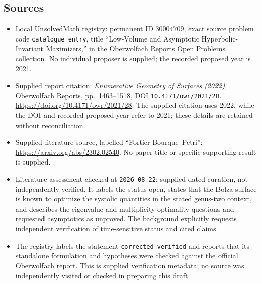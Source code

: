 \documentclass[11pt]{article}
\begin{document}
\subsection{Sources}
\begin{itemize}
\item Local UnsolvedMath registry: permanent ID \(30004709\), exact source problem code \texttt{catalogue entry}, title ``Low-Volume and Asymptotic Hyperbolic-Invariant Maximizers,'' in the Oberwolfach Reports Open Problems collection. No individual proposer is supplied; the recorded proposed year is 2021.
\item Supplied report citation: \emph{Enumerative Geometry of Surfaces (2022)}, Oberwolfach Reports, pp.\ 1463--1518, DOI \texttt{10.4171/owr/2021/28}. \url{https://doi.org/10.4171/owr/2021/28}. The supplied citation uses 2022, while the DOI and recorded proposed year refer to 2021; these details are retained without reconciliation.
\item Supplied literature source, labelled ``Fortier Bourque--Petri'': \url{https://arxiv.org/abs/2302.02540}. No paper title or specific supporting result is supplied.
\item Literature assessment checked at \texttt{2026-08-22}: supplied dated curation, not independently verified. It labels the status open, states that the Bolza surface is known to optimize the systolic quantities in the stated genus-two context, and describes the eigenvalue and multiplicity optimality questions and requested asymptotics as unproved. The background explicitly requests independent verification of time-sensitive status and cited claims.
\item The registry labels the statement \texttt{corrected\_verified} and reports that its standalone formulation and hypotheses were checked against the official Oberwolfach report. This is supplied verification metadata; no source was independently visited or checked in preparing this draft.
\end{itemize}
\end{document}
